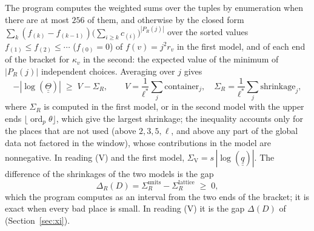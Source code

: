 \documentclass[11pt,a4paper]{article}
\newcommand{\qq}{\underline{\underline{q}}{}}
\newcommand{\Th}{\underline{\underline{\Theta}}{}}
\newcommand{\ord}{\operatorname{ord}}
\begin{document}
The program computes the weighted sums over the tuples by enumeration when there are at most $256$ of them, and
otherwise by the closed form $\sum_k(f_{(k)}-f_{(k-1)})\bigl(\sum_{i\ge k}c_{(i)}\bigr)^{|P_R(j)|}$ over the sorted
values $f_{(1)}\le f_{(2)}\le\cdots$ ($f_{(0)}=0$) of $f(v)=j^2r_v$ in the first model, and of each end of the
bracket for $\kappa_v$ in the second: the expected value of the minimum of $|P_R(j)|$ independent choices.
Averaging over $j$ gives
\[
-|\log(\Th)|\;\ge\;V-\Sigma_R,\qquad V=\frac1{\ell^*}\sum_{j}\text{container}_j,\quad
\Sigma_R=\frac1{\ell^*}\sum_j\text{shrinkage}_j,
\]
where $\Sigma_R$ is computed in the first model, or in the second model with the upper ends
$\lfloor\ord_p\theta\rfloor$, which give the largest shrinkage; the inequality accounts only for the places that are
not used (above $2,3,5,\ell$, and above any part of the global data not factored in the window), whose
contributions in the model are nonnegative. In reading (V) and the first model, $\Sigma_{\mathrm V}=s\,|\log(\qq)|$.
The difference of the shrinkages of the two models is the gap
\[
\Delta_R(D)=\Sigma^{\mathrm{units}}_R-\Sigma^{\mathrm{lattice}}_R\;\ge\;0,
\]
which the program computes as an interval from the two ends of the bracket; it is exact when every bad place is
small. In reading (V) it is the gap $\Delta(D)$ of~\cite{Gap} (Section~\ref{sec:xi}).
\end{document}
